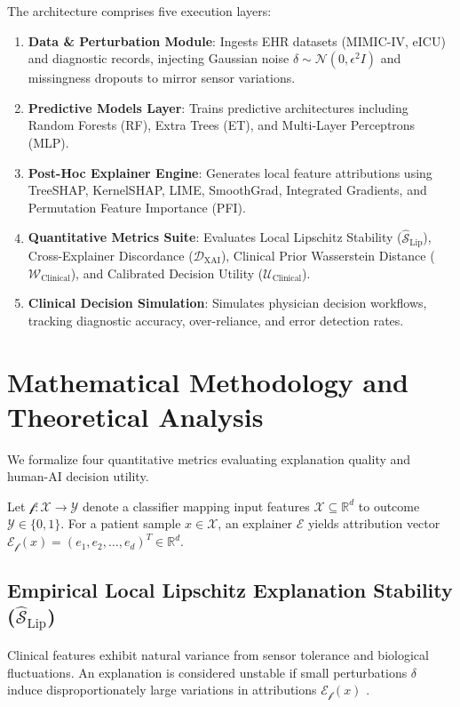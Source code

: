 \documentclass[3p,times,procedia]{elsarticle}
\theoremstyle{definition}
\begin{document}
The architecture comprises five execution layers:
\begin{enumerate}\setlength{\itemsep}{0pt}\setlength{\parsep}{0pt}\setlength{\parskip}{0pt}
    \item \textbf{Data \& Perturbation Module}: Ingests EHR datasets (MIMIC-IV, eICU) and diagnostic records, injecting Gaussian noise $\delta \sim \mathcal{N}(0, \epsilon^2 I)$ and missingness dropouts to mirror sensor variations.
    \item \textbf{Predictive Models Layer}: Trains predictive architectures including Random Forests (RF), Extra Trees (ET), and Multi-Layer Perceptrons (MLP).
    \item \textbf{Post-Hoc Explainer Engine}: Generates local feature attributions using TreeSHAP, KernelSHAP, LIME, SmoothGrad, Integrated Gradients, and Permutation Feature Importance (PFI).
    \item \textbf{Quantitative Metrics Suite}: Evaluates Local Lipschitz Stability ($\widehat{\mathcal{S}}_{\text{Lip}}$), Cross-Explainer Discordance ($\mathcal{D}_{\text{XAI}}$), Clinical Prior Wasserstein Distance ($\mathcal{W}_{\text{Clinical}}$), and Calibrated Decision Utility ($\mathcal{U}_{\text{Clinical}}$).
    \item \textbf{Clinical Decision Simulation}: Simulates physician decision workflows, tracking diagnostic accuracy, over-reliance, and error detection rates.
\end{enumerate}

\section{Mathematical Methodology and Theoretical Analysis}
We formalize four quantitative metrics evaluating explanation quality and human-AI decision utility.

Let $\mathcal{f}: \mathcal{X} \rightarrow \mathcal{Y}$ denote a classifier mapping input features $\mathcal{X} \subseteq \mathbb{R}^d$ to outcome $\mathcal{Y} \in \{0, 1\}$. For a patient sample $x \in \mathcal{X}$, an explainer $\mathcal{E}$ yields attribution vector $\mathcal{E}_{\mathcal{f}}(x) = (e_1, e_2, \dots, e_d)^T \in \mathbb{R}^d$.

\subsection{Empirical Local Lipschitz Explanation Stability ($\widehat{\mathcal{S}}_{\text{Lip}}$)}
Clinical features exhibit natural variance from sensor tolerance and biological fluctuations. An explanation is considered unstable if small perturbations $\delta$ induce disproportionately large variations in attributions $\mathcal{E}_{\mathcal{f}}(x)$ \cite{ramya2023predictive}.
\end{document}
